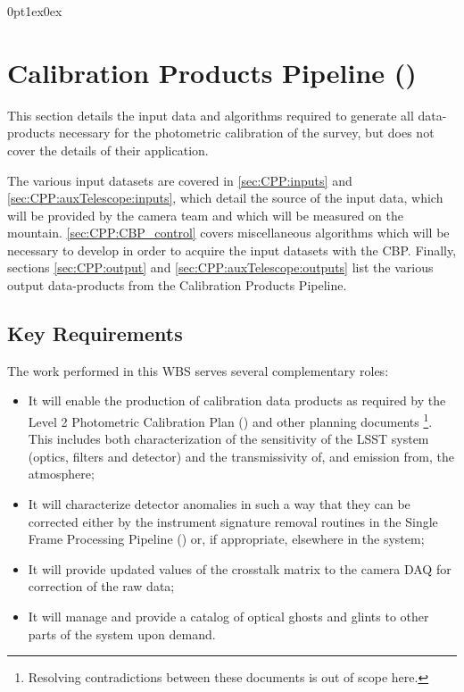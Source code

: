\titlespacing*{\subsubsection}
{0pt}{1ex}{0ex}


\section{Calibration Products Pipeline (\wbsCPP)}
\label{sec:cpp}

This section details the input data and algorithms required to generate all data-products necessary for the photometric calibration of the survey, but does not cover the details of their application.

The various input datasets are covered in \secsymbol\ref{sec:CPP:inputs} and \secsymbol\ref{sec:CPP:auxTelescope:inputs}, which detail the source of the input data, \ie which will be provided by the camera team and which will be measured on the mountain. \secsymbol\ref{sec:CPP:CBP_control} covers miscellaneous algorithms which will be necessary to develop in order to acquire the input datasets with the CBP. Finally, sections \secsymbol\ref{sec:CPP:output} and \secsymbol\ref{sec:CPP:auxTelescope:outputs} list the various output data-products from the Calibration Products Pipeline.

\subsection{Key Requirements}
\label{sec:CPP:keyRequirements}
The work performed in this WBS serves several complementary roles:

\begin{itemize}
 \item It will enable the production of calibration data products as required by the Level 2 Photometric Calibration Plan (\NewPCP{}) and other planning documents \cite{Lupton15}\footnote{Resolving contradictions between these documents is out of scope here.}. This includes both characterization of the sensitivity of the LSST system (optics, filters and detector) and the transmissivity of, and emission from, the atmosphere;
 
 \item It will characterize detector anomalies in such a way that they can be corrected either by the instrument signature removal routines in the Single Frame Processing Pipeline (\wbsSFM) or, if appropriate, elsewhere in the system;
 
 \item It will provide updated values of the crosstalk matrix to the camera DAQ for correction of the raw data;
 
 \item It will manage and provide a catalog of optical ghosts and glints to other parts of the system upon demand.
\end{itemize}


